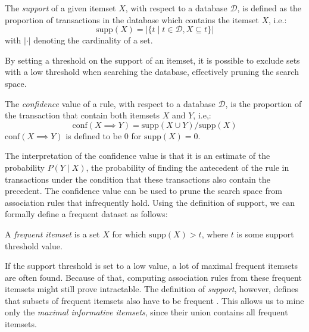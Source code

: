 \begin{definition}[Support]
	The \emph{support} of a given itemset $X$, with respect to a database $\mathcal{D}$, is defined as the proportion of transactions in the database which contains the itemset $X$, i.e.:
	\begin{equation*}
		\mathrm{supp}(X)=|\{t \mid t\in\mathcal{D}, X \subseteq t\}|
	\end{equation*}
	\noindent with $|\cdot|$ denoting the cardinality of a set.
\end{definition}

By setting a threshold on the support of an itemset, it is possible to exclude sets with a low threshold when searching the database, effectively pruning the search space.

\begin{definition}[Confidence]
	The \emph{confidence} value of a rule, with respect to a database $\mathcal{D}$, is the proportion of the transaction that contain both itemsets $X$ and $Y$, i.e,:
	\begin{equation}
		\mathrm{conf}(X \implies Y)=\mathrm{supp}(X \cup Y)/\mathrm{supp}(X)
	\end{equation}
	\noindent $\mathrm{conf}(X \implies Y)$ is defined to be $0$ for $\mathrm{supp}(X)=0$.
\end{definition}

The interpretation of the confidence value is that it is an estimate of the probability $P(Y \mid X)$, the probability of finding the antecedent of the rule in transactions under the condition that these transactions also contain the precedent.
The confidence value can be used to prune the search space from association rules that infrequently hold.
Using the definition of support, we can formally define a frequent dataset as follows:

\begin{definition}
	A \emph{frequent itemset} is a set $X$ for which $\mathrm{supp}(X)>t$, where $t$ is some support threshold value.
\end{definition}

If the support threshold is set to a low value, a lot of maximal frequent itemsets are often found.
Because of that, computing association rules from these frequent itemsets might still prove intractable.
The definition of \emph{support}, however, defines that subsets of frequent itemsets also have to be frequent \citep{Hahsler2007}.
This allows us to mine only the \emph{maximal informative itemsets}, since their union contains all frequent itemsets.

